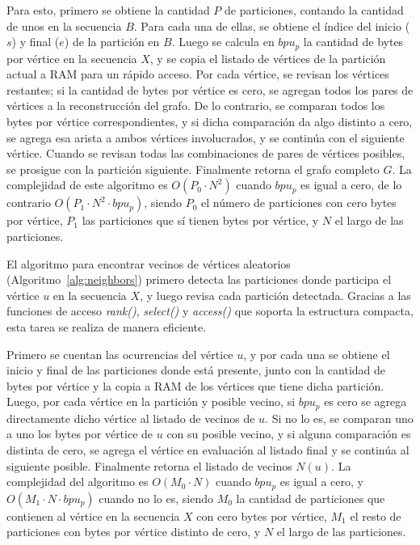 Para esto, primero se obtiene la cantidad $P$ de particiones, contando la cantidad de unos en la secuencia $B$. Para cada una de ellas, se obtiene el índice del inicio ($s$) y final ($e$) de la partición en $B$. Luego se calcula en $bpu_{p}$ la cantidad de bytes por vértice en la secuencia $X$, y se copia el listado de vértices de la partición actual a RAM para un rápido acceso. Por cada vértice, se revisan los vértices restantes; si la cantidad de bytes por vértice es cero, se agregan todos los pares de vértices a la reconstrucción del grafo. De lo contrario, se comparan todos los bytes por vértice correspondientes, y si dicha comparación da algo distinto a cero, se agrega esa arista a ambos vértices involucrados, y se continúa con el siguiente vértice. Cuando se revisan todas las combinaciones de pares de vértices posibles, se prosigue con la partición siguiente. Finalmente retorna el grafo completo $G$.  La complejidad de este algoritmo es $O(P_{0} \cdot N^{2})$ cuando $bpu_{p}$ es igual a cero, de lo contrario $O(P_{1} \cdot N^{2} \cdot bpu_{p})$, siendo $P_{0}$ el número de particiones con cero bytes por vértice, $P_{1}$ las particiones que sí tienen bytes por vértice, y $N$ el largo de las particiones.

El algoritmo para encontrar vecinos de vértices aleatorios (Algoritmo~\ref{alg:neighbors}) primero detecta las particiones donde participa el vértice $u$ en la secuencia $X$, y luego revisa cada partición detectada. Gracias a las funciones de acceso \textit{rank()}, \textit{select()} y \textit{access()} que soporta la estructura compacta, esta tarea se realiza de manera eficiente.

Primero se cuentan las ocurrencias del vértice $u$, y por cada una se obtiene el inicio y final de las particiones donde está presente, junto con la cantidad de bytes por vértice y la copia a RAM de los vértices que tiene dicha partición. Luego, por cada vértice en la partición y posible vecino, si $bpu_{p}$ es cero se agrega directamente dicho vértice al listado de vecinos de $u$. Si no lo es, se comparan uno a uno los bytes por vértice de $u$ con su posible vecino, y si alguna comparación es distinta de cero, se agrega el vértice en evaluación al listado final y se continúa al siguiente posible. Finalmente retorna el listado de vecinos $N(u)$. La complejidad del algoritmo es $O(M_{0} \cdot N)$ cuando $bpu_{p}$ es igual a cero, y $O(M_{1} \cdot N \cdot bpu_{p})$ cuando no lo es, siendo $M_{0}$ la cantidad de particiones que contienen al vértice en la secuencia $X$ con cero bytes por vértice, $M_{1}$ el resto de particiones con bytes por vértice distinto de cero, y $N$ el largo de las particiones.

